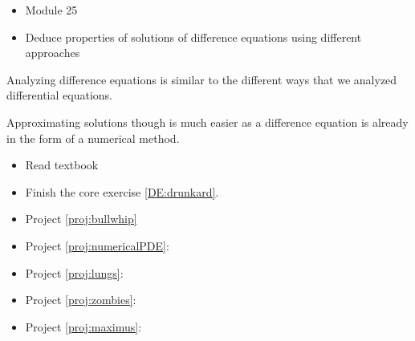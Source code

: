 \begin{lesson}




	\begin{itemize}
		\item Module 25
	\end{itemize}

	\begin{itemize}
		\item Deduce properties of solutions of difference equations using different approaches
	\end{itemize}
	


Analyzing difference equations is similar to the different ways that we analyzed differential equations.

Approximating solutions though is much easier as a difference equation is already in the form of a numerical method.


\begin{itemize}
	\item Read textbook
	\item Finish the core exercise \ref{DE:drunkard}.
\end{itemize}

\begin{itemize}
	\item Project \ref{proj:bullwhip} \bullwhiptitle
	\item Project \ref{proj:numericalPDE}: \numericalPDEtitle
	\item Project \ref{proj:lungs}:\lungstitle
	\item Project \ref{proj:zombies}: \zombiestitle
	\item Project \ref{proj:maximus}: \maximustitle
\end{itemize}


\end{lesson}


